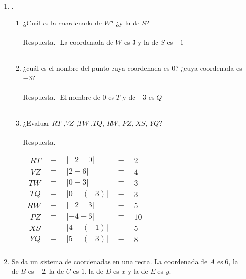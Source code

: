 \begin{enumerate}
\item .
\begin{center}
\end{center}
\begin{enumerate}[\bfseries (a)]
\item ¿Cuál es la coordenada de $W$? ¿y la de $S$?\\\\
Respuesta.- \; La coordenada de $W$ es $3$ y la de $S$ es $-1$\\\\
\item ¿cuál es el nombre del punto cuya coordenada es $0$? ¿cuya coordenada es $-3$?\\\\
Respuesta.- \; El nombre de $0$ es $T$ y de $-3$ es $Q$\\\\
\item ¿Evaluar $RT$ ,$VZ$ ,$TW$ ,$TQ$, $RW$, $PZ$, $XS$, $YQ$?\\\\
Respuesta.- \; 
\begin{center}
\begin{tabular}{r c l c l}
$RT$&$=$&$|-2-0|$&$=$&$2$\\
$VZ$&$=$&$|2-6|$&$=$&$4$\\
$TW$&$=$&$|0-3|$&$=$&$3$\\
$TQ$&$=$&$|0-(-3)|$&$=$&$3$\\
$RW$&$=$&$|-2-3|$&$=$&$5$\\
$PZ$&$=$&$|-4-6|$&$=$&$10$\\
$XS$&$=$&$|4-(-1)|$&$=$&$5$\\
$YQ$&$=$&$|5-(-3)|$&$=$&$8$\\\\
\end{tabular}
\end{center}
\end{enumerate}
\item Se da un sistema de coordenadas en una recta. La coordenada de $A$ es $6$, la de $B$ es $-2$, la de $C$ es $1$, la de $D$ es $x$ y la de $E$ es $y$.

\end{enumerate}
